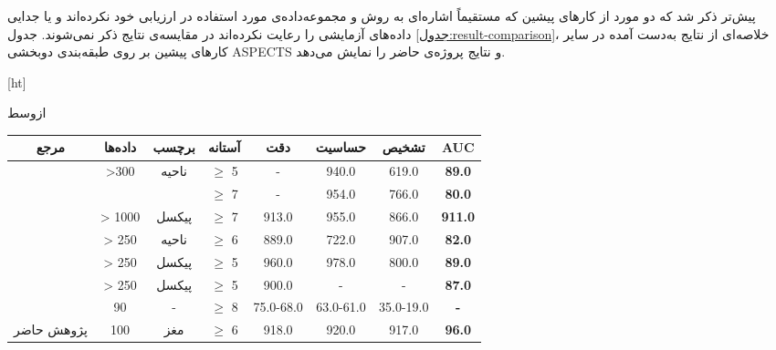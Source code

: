 پیش‌تر ذکر شد که دو مورد از کارهای پیشین که مستقیماً اشاره‌ای به روش و مجموعه‌داده‌ی مورد استفاده در ارزیابی خود نکرده‌اند \cite{naganuma2021alberta} و یا جدایی داده‌های آزمایشی را رعایت نکرده‌اند \cite{golkonda2022automated} در مقایسه‌ی نتایج ذکر نمی‌شوند.
جدول \ref{جدول:result-comparison}، خلاصه‌ای از نتایج به‌دست آمده در سایر کارهای پیشین بر روی طبقه‌بندی دو‌بخشی ASPECTS و نتایج پروژه‌ی حاضر را نمایش می‌دهد.

[ht]

\vspace{1.5em}

‌ازوسط

    \begin{tabular}{cccccccc}
    \hline
    مرجع                                    & داده‌ها           & برچسب                     & آستانه‌ & دقت & حساسیت & تشخیص & \textbf{AUC}  \\ \hline
    \multirow{2}{*}{\cite{lee2023clinical}} & \multirow{2}{*}{>300} & \multirow{2}{*}{ناحیه} & $\geq$ 5              & -   & 940.0  & 619.0 & \textbf{89.0} \\ 
                                            &                       &                            & $\geq$ 7               & -   & 954.0  & 766.0 & \textbf{80.0} \\ 
    \cite{cao2022deep}                      & > 1000                &     پیکسل                 & $\geq$ 7               & 913.0 &955.0 & 866.0  & \textbf{911.0} \\ 
    \cite{chiang2022deep}                   & > 250                 &     ناحیه                 & $\geq$ 6               & 889.0 &722.0 & 907.0  & \textbf{82.0} \\ 
    \cite{kuang2019automated}               & > 250                 &     پیکسل                 & $\geq$ 5               & 960.0 &978.0 & 800.0  & \textbf{89.0} \\ 
    \cite{kuang2021eis}                     & > 250                 &     پیکسل                 & $\geq$ 5               & 900.0 &-    & -       & \textbf{87.0} \\
    \cite{yu2021automated}                  & 90                    & -                          & $\geq$ 8               & 75.0-68.0 &63.0-61.0  & 35.0-19.0 & \textbf{-} \\
    پژوهش حاضر                             & 100                   &     مغز                   & $\geq$ 6               & 918.0 &920.0    & 917.0  & \textbf{96.0} \\ \hline
    \end{tabular}

